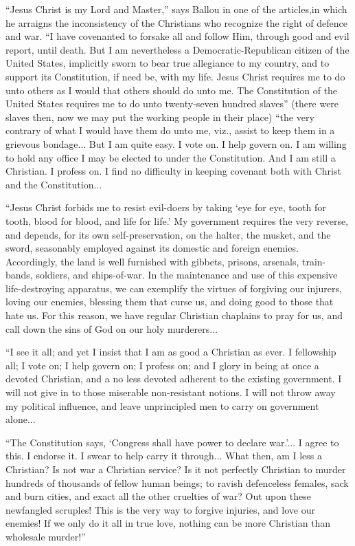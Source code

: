 \documentclass{book}
\begin{document}
“Jesus Christ is my Lord and Master,” says Ballou in one of the articles,\footnotemark[1] in which he arraigns the inconsistency of the Christians who recognize the right of defence and war. “I have covenanted to forsake all and follow Him, through good and evil report, until death. But I am nevertheless a Democratic-Republican citizen of the United States, implicitly sworn to bear true allegiance to my country, and to support its Constitution, if need be, with my life. Jesus Christ requires me to do unto others as I would that others should do unto me. The Constitution of the United States requires me to do unto twenty-seven hundred slaves” (there were slaves then, now we may put the working people in their place) “the very contrary of what I would have them do unto me, viz., assist to keep them in a grievous bondage... But I am quite easy. I vote on. I help govern on. I am willing to hold any office I may be elected to under the Constitution. And I am still a Christian. I profess on. I find no difficulty in keeping covenant both with Christ and the Constitution...

“Jesus Christ forbids me to resist evil-doers by taking ‘eye for eye, tooth for tooth, blood for blood, and life for life.’ My government requires the very reverse, and depends, for its own self-preservation, on the halter, the musket, and the sword, seasonably employed against its domestic and foreign enemies. Accordingly, the land is well furnished with gibbets, prisons, arsenals, train-bands, soldiers, and ships-of-war. In the maintenance and use of this expensive life-destroying apparatus, we can exemplify the virtues of forgiving our injurers, loving our enemies, blessing them that curse us, and doing good to those that hate us. For this reason, we have regular Christian chaplains to pray for us, and call down the sins of God on our holy murderers...

“I see it all; and yet I insist that I am as good a Christian as ever. I fellowship all; I vote on; I help govern on; I profess on; and I glory in being at once a devoted Christian, and a no less devoted adherent to the existing government. I will not give in to those miserable non-resistant notions. I will not throw away my political influence, and leave unprincipled men to carry on government alone...

“The Constitution says, ‘Congress shall have power to declare war.’... I agree to this. I endorse it. I swear to help carry it through... What then, am I less a Christian? Is not war a Christian service? Is it not perfectly Christian to murder hundreds of thousands of fellow human beings; to ravish defenceless females, sack and burn cities, and exact all the other cruelties of war? Out upon these newfangled scruples! This is the very way to forgive injuries, and love our enemies! If we only do it all in true love, nothing can be more Christian than wholesale murder!”
\end{document}
